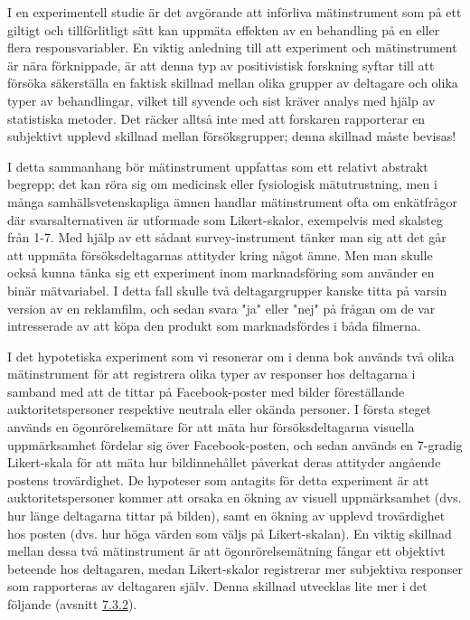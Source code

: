 \documentclass[
]{book}
\begin{document}
I en experimentell studie är det avgörande att införliva mätinstrument som på ett giltigt och tillförlitligt sätt kan uppmäta effekten av en behandling på en eller flera responsvariabler. En viktig anledning till att experiment och mätinstrument är nära förknippade, är att denna typ av positivistisk forskning syftar till att försöka säkerställa en faktisk skillnad mellan olika grupper av deltagare och olika typer av behandlingar, vilket till syvende och sist kräver analys med hjälp av statistiska metoder. Det räcker alltså inte med att forskaren rapporterar en subjektivt upplevd skillnad mellan försöksgrupper; denna skillnad måste bevisas!

I detta sammanhang bör mätinstrument uppfattas som ett relativt abstrakt begrepp; det kan röra sig om medicinsk eller fysiologisk mätutrustning, men i många samhällsvetenskapliga ämnen handlar mätinstrument ofta om enkätfrågor där svarsalternativen är utformade som Likert-skalor, exempelvis med skalsteg från 1-7. Med hjälp av ett sådant survey-instrument tänker man sig att det går att uppmäta försöksdeltagarnas attityder kring något ämne. Men man skulle också kunna tänka sig ett experiment inom marknadsföring som använder en binär mätvariabel. I detta fall skulle två deltagargrupper kanske titta på varsin version av en reklamfilm, och sedan svara "ja" eller "nej" på frågan om de var intresserade av att köpa den produkt som marknadsfördes i båda filmerna.

I det hypotetiska experiment som vi resonerar om i denna bok används två olika mätinstrument för att registrera olika typer av responser hos deltagarna i samband med att de tittar på Facebook-poster med bilder föreställande auktoritetspersoner respektive neutrala eller okända personer. I första steget används en ögonrörelsemätare för att mäta hur försöksdeltagarna visuella uppmärksamhet fördelar sig över Facebook-posten, och sedan används en 7-gradig Likert-skala för att mäta hur bildinnehållet påverkat deras attityder angående postens trovärdighet. De hypoteser som antagits för detta experiment är att auktoritetspersoner kommer att orsaka en ökning av visuell uppmärksamhet (dvs. hur länge deltagarna tittar på bilden), samt en ökning av upplevd trovärdighet hos posten (dvs. hur höga värden som väljs på Likert-skalan). En viktig skillnad mellan dessa två mätinstrument är att ögonrörelsemätning fångar ett objektivt beteende hos deltagaren, medan Likert-skalor registrerar mer subjektiva responser som rapporteras av deltagaren själv. Denna skillnad utvecklas lite mer i det följande (avsnitt \protect\hyperlink{sub07.3.2}{7.3.2}).
\end{document}
